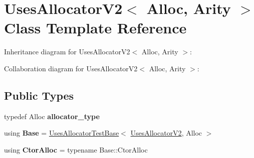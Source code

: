 \hypertarget{class_uses_allocator_v2}{}\section{Uses\+Allocator\+V2$<$ Alloc, Arity $>$ Class Template Reference}
\label{class_uses_allocator_v2}


Inheritance diagram for Uses\+Allocator\+V2$<$ Alloc, Arity $>$\+:


Collaboration diagram for Uses\+Allocator\+V2$<$ Alloc, Arity $>$\+:
\subsection*{Public Types}
\begin{DoxyCompactItemize}
\item 
\mbox{\label{class_uses_allocator_v2_a26009d27bd6a65c2c54626591752e93a}} 
typedef Alloc {\bfseries allocator\+\_\+type}
\item 
\mbox{\label{class_uses_allocator_v2_aaf348a1d98038fb1e0d74ba946520012}} 
using {\bfseries Base} = \mbox{\hyperlink{struct_uses_allocator_test_base}{Uses\+Allocator\+Test\+Base}}$<$ \mbox{\hyperlink{class_uses_allocator_v2}{Uses\+Allocator\+V2}}, Alloc $>$
\item 
\mbox{\label{class_uses_allocator_v2_a6733b85b5d1294399dcf210f884205ba}} 
using {\bfseries Ctor\+Alloc} = typename Base\+::\+Ctor\+Alloc
\end{DoxyCompactItemize}
